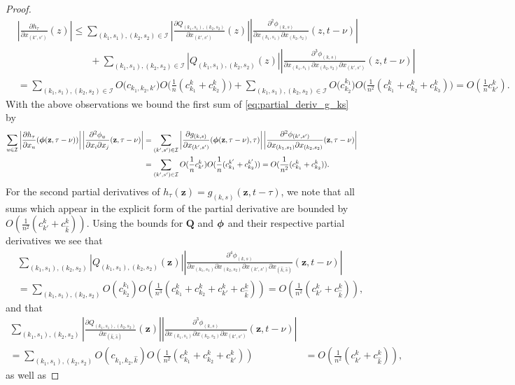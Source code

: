 \documentclass[acmsmall]{acmart}
\newcommand\bz{\mathbf{z}}
\newcommand\bphi{\text{\boldmath$\phi$}}
\newcommand\bQ{\mathbf{Q}}
\newcommand\calI{\mathcal{I}}
\newcommand\abs[1]{\left|#1\right|}         %
\newcommand{\dddd}[5]{ \frac{\partial^4 #1 }{ \partial x_{#2} \partial x_{#3} \partial x_{#4} \partial x_{#5} }}
\newcommand{\ddd}[4]{ \frac{\partial^3 #1 }{ \partial x_{#2} \partial x_{#3} \partial x_{#4} }}
\begin{document}
\begin{proof}
\begin{align*}
&\abs{\frac{\partial h_\tau}{\partial x_{(k',s')}}(z)} \leq \sum_{(k_1,s_1),(k_2,s_2) \in \calI} \abs{\frac{\partial Q_{(k_1,s_1),(k_2,s_2)}}{\partial x_{(k',s')}}(z)} \abs{\frac{\partial^2 \phi_{(k,s)}}{\partial x_{(k_1,s_1)} \partial x_{(k_2,s_2)}}(z,t-\nu)} \\
& \phantom{\frac{\partial h_\tau}{\partial x_{(k',s')}}(z) \leq} \quad + \sum_{(k_1,s_1),(k_2,s_2) \in \calI} \abs{Q_{(k_1,s_1),(k_2,s_2)}(z)} \abs{\frac{\partial^3 \phi_{(k,s)}}{\partial x_{(k_1,s_1)} \partial x_{(k_2,s_2)} \partial x_{(k',s')}}(z,t-\nu)} \\
& = \sum_{(k_1,s_1),(k_2,s_2) \in \calI} O\bigl(c_{k_1,k_2,k'}\bigr)O\bigl(\frac{1}{n}(c^k_{k_1}+c^k_{k_2})\bigr) + \sum_{(k_1,s_1),(k_2,s_2) \in \calI} O\bigl( c^{k_1}_{k_2} \bigr)O\bigl( \frac{1}{n^2} (c^{k}_{k_1} + c^{k}_{k_2} + c^{k}_{k_3})\bigr) 
= O(\frac1n c^{k}_{k'}).
\end{align*}
With the above observations we bound the first sum of \eqref{eq:partial_deriv_g_ks} by
\begin{align*}
\sum_{u \in \calI} \abs{\frac{\partial h_\tau}{\partial x_u}(\bphi (\bz, \tau-\nu))} \abs{\frac{\partial^2 \phi_u}{\partial x_i \partial x_j}(\bz,\tau-\nu)}
& =\sum_{(k',s') \in \calI} \abs{\frac{\partial g_{(k,s)}}{\partial x_{(k',s')}}(\bphi (\bz, \tau-\nu), \tau)} \abs{\frac{\partial^2 \phi_{(k',s')}}{\partial x_{(k_1,s_1)} \partial x_{(k_2,s_2)}}(\bz,\tau-\nu)} \\
& = \sum_{(k',s')\in\calI} O(\frac1n c^k_{k'})O(\frac1n (c^{k'}_{k_1} + c^{k'}_{k_2})) = O(\frac{1}{n^2}(c^k_{k_1} + c^k_{k_2})).
\end{align*}
For the second partial derivatives of $h_\tau(\bz) = g_{(k,s)}(\bz,t-\tau)$, we note that all sums which appear in the explicit form of the partial derivative are bounded by $O(\frac{1}{n^2}(c^k_{k'} + c^k_{\hat{k}}))$. Using the bounds for $\bQ$ and $\bphi$ and their respective partial derivatives we see that
\begin{align*}
&\sum_{(k_1,s_1),(k_2,s_2)}  \abs{Q_{(k_1,s_1),(k_2,s_2)}(\bz)} \abs{\dddd{\phi_{(k,s)}}{(k_1,s_1)}{(k_2,s_2)}{(k',s')}{(\hat{k},\hat{s})}(\bz, t-\nu)} \\
&= \sum_{(k_1,s_1),(k_2,s_2)} O(c^{k_1}_{k_2})O(\frac{1}{n^3}( c^k_{k_1} + c^k_{k_2} + c^k_{k'} + c^k_{\hat{k}})) = O(\frac{1}{n^2}(c^k_{k'} + c^k_{\hat{k}})),
\end{align*}
and that
\begin{align*}
\sum_{(k_1,s_1),(k_2,s_2)}  \abs{\frac{\partial Q_{(k_1,s_1),(k_2,s_2)}}{\partial x_{(\hat{k},\hat{s})}}(\bz)} \abs{\ddd{\phi_{(k,s)}}{(k_1,s_1)}{(k_2,s_2)}{(k',s')}(\bz, t-\nu)}\\
= \sum_{(k_1,s_1),(k_2,s_2)} O(c_{k_1,k_2,\hat{k}})O(\frac{1}{n^2}( c^k_{k_1} + c^k_{k_2} + c^k_{k'}))
&= O(\frac{1}{n^2}(c^k_{k'} + c^k_{\hat{k}})),
\end{align*}
as well as 



\end{proof}
\end{document}
